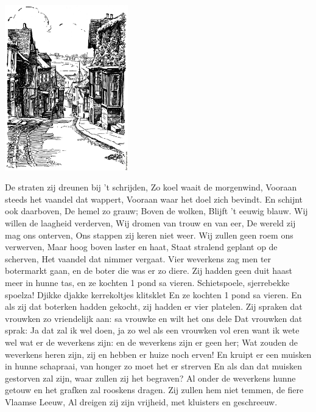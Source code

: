 \documentclass{article}
\begin{document}
\begin{songs}{}
\begin{intersong}
    \includegraphics[width=0.4\textwidth]{destratenzijdreunen}
\end{intersong}
\beginverse*
De straten zij dreunen bij 't schrijden,
Zo koel waait de morgenwind,
Vooraan steeds het vaandel dat wappert,
Vooraan waar het doel zich bevindt.
\endverse
\beginchorus
En schijnt ook daarboven, De hemel zo grauw;
Boven de wolken, Blijft 't eeuwig blauw.
\endchorus
\beginverse*
Wij willen de laagheid verderven,
Wij dromen van trouw en van eer,
De wereld zij mag ons onterven,
Ons stappen zij keren niet weer.
\endverse
\beginverse*
Wij zullen geen roem ons verwerven,
Maar hoog boven laster en haat,
Staat stralend geplant op de scherven,
Het vaandel dat nimmer vergaat.
\endverse
\endsong
{}
\beginverse*
Vier weverkens zag men ter botermarkt gaan, en de boter die was er zo diere.
Zij hadden geen duit haast meer in hunne tas, en ze kochten 1 pond sa vieren.
\endverse
\beginverse*
Schietspoele, sjerrebekke spoelza! Djikke djakke kerrekoltjes klitsklet
En ze kochten 1 pond sa vieren.
\endverse
\beginverse*
En als zij dat boterken hadden gekocht, zij hadden er vier platelen.
Zij spraken dat vrouwken zo vriendelijk aan: sa vrouwke en wilt het ons dele
\endverse
\beginverse*
Dat vrouwken dat sprak: Ja dat zal ik wel doen,
ja zo wel als een vrouwken vol eren
want ik wete wel wat er de weverkens zijn: en de weverkens zijn er geen her;
Wat zouden de weverkens heren zijn, zij en hebben er huize noch erven!
En kruipt er een muisken in hunne schapraai, van honger zo moet het er strerven
\endverse
\beginverse*
En als dan dat muisken gestorven zal zijn, waar zullen zij het begraven?
Al onder de weverkens hunne getouw en het grafken zal rooskens dragen.
\endverse
\endsong
{}
\beginverse*
Zij zullen hem niet temmen, 
de fiere Vlaamse Leeuw,
Al dreigen zij zijn vrijheid,
met kluisters en geschreeuw.

\end{songs}
\end{document}
